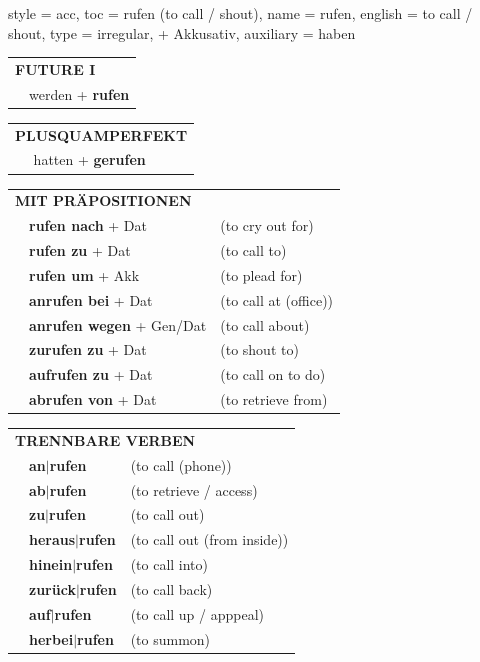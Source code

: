 \begin{verbentry}{
  style = {acc},
  toc = {rufen (to call / shout)},
  name = {rufen},
  english = {to call / shout},
  type = {irregular, + Akkusativ},
  auxiliary = {haben}
}
\begin{tabular}{rl}
    \multicolumn{2}{l}{\textbf{FUTURE I} }\\
   & werden + \textbf{rufen}\\
 
  \end{tabular}
\hfill
   \begin{tabular}{rl}
      \multicolumn{2}{l}{\textbf{PLUSQUAMPERFEKT}}\\
   & hatten + \textbf{gerufen}\\
  \end{tabular}
  

 \vspace{10pt}

   \begin{tabular}{lll}
      \multicolumn{3}{l}{\textbf{MIT PRÄPOSITIONEN}}\\
& \textbf{rufen nach} + Dat & (to cry out for)\\
& \textbf{rufen zu} + Dat & (to call to)\\
&\textbf{rufen um} + Akk & (to plead for)\\
&\textbf{anrufen bei} + Dat & (to call at (office))\\
&\textbf{anrufen wegen} + Gen/Dat & (to call about)\\
&\textbf{zurufen zu} + Dat & (to shout to)\\
&\textbf{aufrufen zu} + Dat & (to call on to do)\\
&\textbf{abrufen von} + Dat & (to retrieve from)\\
  \end{tabular}
  \hfill
   \begin{tabular}{lll}
      \multicolumn{3}{l}{\textbf{TRENNBARE VERBEN}}\\
 & \textbf{an$|$rufen} & (to call (phone))\\
 & \textbf{ab$|$rufen} & (to retrieve / access)\\
 & \textbf{zu$|$rufen} & (to call out)\\
  & \textbf{heraus$|$rufen} & (to call out (from inside))\\
  & \textbf{hinein$|$rufen} & (to call into)\\
  & \textbf{zurück$|$rufen} & (to call back)\\
  & \textbf{auf$|$rufen} & (to call up / apppeal)\\
     & \textbf{herbei$|$rufen} & (to summon)\\  
  \end{tabular}


  \vspace{-5pt}
\end{verbentry}

